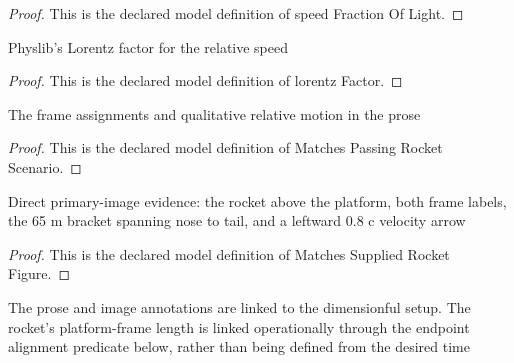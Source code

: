 \begin{proof}
  This is the declared model definition of speed Fraction Of Light.
\end{proof}
\begin{definition}
  \label{def:physics:phyx-mini-0552:phyxminiproblems-problemphyxmini0552-lorentzfactor}
  Physlib's Lorentz factor for the relative speed
\end{definition}
\begin{proof}
  This is the declared model definition of lorentz Factor.
\end{proof}
\begin{definition}
  \label{def:physics:phyx-mini-0552:phyxminiproblems-problemphyxmini0552-matchespassingrocketscenario}
  The frame assignments and qualitative relative motion in the prose
\end{definition}
\begin{proof}
  This is the declared model definition of Matches Passing Rocket Scenario.
\end{proof}
\begin{definition}
  \label{def:physics:phyx-mini-0552:phyxminiproblems-problemphyxmini0552-matchessuppliedrocketfigure}
  Direct primary-image evidence: the rocket above the platform, both frame labels, the 65 m bracket spanning nose to tail, and a leftward 0.8 c velocity arrow
\end{definition}
\begin{proof}
  This is the declared model definition of Matches Supplied Rocket Figure.
\end{proof}
\begin{definition}
  \label{def:physics:phyx-mini-0552:phyxminiproblems-problemphyxmini0552-matchesproblemreadouts}
  The prose and image annotations are linked to the dimensionful setup. The rocket's platform-frame length is linked operationally through the endpoint alignment predicate below, rather than being defined from the desired time
\end{definition}
